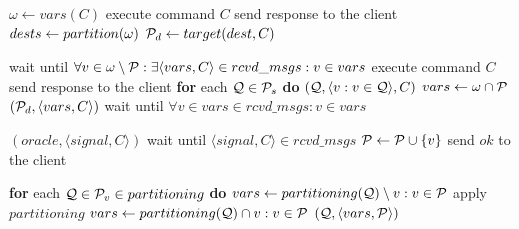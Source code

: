 \begin{algorithm}[h!]
\small

\begin{distribalgo}[1]

	\STATE $\omega \leftarrow vars(C)$
		\STATE execute command $C$
		\STATE send response to the client
		\STATE $dests \leftarrow partition(\omega)$
		\STATE $\mathcal{P}_d \leftarrow target(dest, C)$

			\STATE wait until $\forall v \in \omega \setminus \mathcal{P}: \exists \langle vars, C \rangle \in rcvd\_msgs :v \in vars$
			\STATE execute command $C$
			\STATE send response to the client
			\STATE \textbf{for} each $\mathcal{Q} \in \mathcal{P}_s$ \textbf{do} \rmcast$(\mathcal{Q}, \langle v:v \in \mathcal{Q} \rangle, C)$
			\STATE $vars \leftarrow \omega \cap \mathcal{P}$
			\STATE \rmcast$(\mathcal{P}_d, \langle vars, C \rangle)$
			\STATE wait until $\forall v \in vars \in rcvd\_msgs : v \in vars$
		\ENDIF		
	\ENDIF
\ENDINDENT

\vspace{1.0mm}

\vspace{1.0mm}
	\STATE \rmcast$(oracle, \langle signal, C \rangle )$
	\STATE wait until $\langle signal, C \rangle \in rcvd\_msgs$
	\STATE $\mathcal{P} \leftarrow \mathcal{P} \cup \{v\}$
	\STATE send $ok$ to the client
\ENDINDENT

\vspace{1.0mm}
	\STATE \textbf{for} each $\mathcal{Q} \in \mathcal{P}_v \in partitioning$ \textbf{do} 
			\STATE $vars \leftarrow partitioning(\mathcal{Q}) \setminus v:v \in \mathcal{P}$
				\STATE apply $partitioning$
			\ENDIF
		\ELSE 
			\STATE $vars \leftarrow partitioning(\mathcal{Q}) \cap v:v \in \mathcal{P}$
			\STATE \rmcast$(\mathcal{Q}, \langle vars, \mathcal{P} \rangle )$
		\ENDIF
\ENDINDENT


\end{distribalgo}
\end{algorithm}
